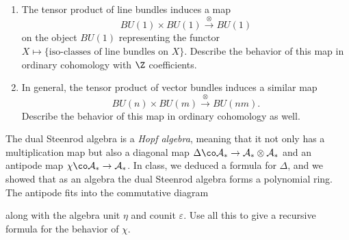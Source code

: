 \begin{problem}
\begin{enumerate}
    \item The tensor product of line bundles induces a map \[BU(1) \times BU(1) \xrightarrow{\otimes} BU(1)\] on the object $BU(1)$ representing the functor $X \mapsto \{\text{iso-classes of line bundles on $X$}\}$.  Describe the behavior of this map in ordinary cohomology with $\Z$ coefficients.
    \item In general, the tensor product of vector bundles induces a similar map \[BU(n) \times BU(m) \xrightarrow{\otimes} BU(nm).\]  Describe the behavior of this map in ordinary cohomology as well.
\end{enumerate}
\end{problem}

\begin{problem}
The dual Steenrod algebra is a \textit{Hopf algebra}, meaning that it not only has a multiplication map but also a diagonal map $\Delta\co \mathcal A_* \to \mathcal A_* \otimes \mathcal A_*$ and an antipode map $\chi\co \mathcal A_* \to \mathcal A_*$.  In class, we deduced a formula for $\Delta$, and we showed that as an algebra the dual Steenrod algebra forms a polynomial ring.  The antipode fits into the commutative diagram
\begin{center}
\end{center}
along with the algebra unit $\eta$ and counit $\varepsilon$.  Use all this to give a recursive formula for the behavior of $\chi$.
\end{problem}




